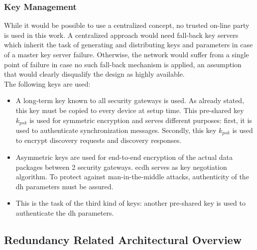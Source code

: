 \subsubsection{Key Management}

While it would be possible to use a centralized concept, no trusted on-line party is used in this work. A centralized approach would need fall-back key servers
which inherit the task of generating and distributing keys and parameters in case of a master key server failure. Otherwise, the network would suffer from a
single point of failure in case no such fall-back mechanism is applied, an assumption that would clearly disqualify the design as highly available.
\\
The following keys are used:

\begin{itemize}
 \item A long-term key known to all security gateways is used. As already stated, this key must be copied to every device at setup time. 
This pre-shared key $k_{psk}$ is used for symmetric encryption and serves different purposes: first, it is used to authenticate synchronization messages.
Secondly, this key $k_{psk}$ is used to encrypt discovery requests and discovery responses.
 \item Asymmetric keys are used for end-to-end encryption of the actual data packages between 2 security gateways. \gls{ecdh} serves as key negotiation algorithm.
 To protect against man-in-the-middle attacks, authenticity of the \gls{dh} parameters must be assured.
 \item This is the task of the third kind of keys: another pre-shared key is used to authenticate the \gls{dh} parameters.
\end{itemize}


\subsection{Redundancy Related Architectural Overview}\label{ctrAvail}
 
